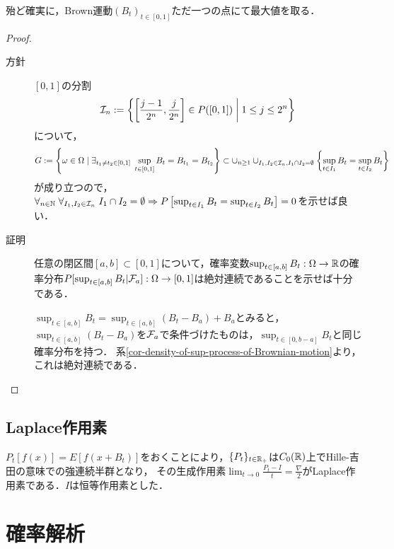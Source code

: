 \documentclass[uplatex,dvipdfmx]{jsreport}
\begin{document}
\begin{lemma}
    殆ど確実に，Brown運動$(B_t)_{t\in[0,1]}$ただ一つの点にて最大値を取る．
\end{lemma}
\begin{proof}\mbox{}
    \begin{description}
        \item[方針] $[0,1]$の分割
        \[\mathcal{I}_n:=\left\{\left[\frac{j-1}{2^n},\frac{j}{2^n}\right]\in P([0,1])\;\middle|\;1\le j\le 2^n\right\}\]
        について，
        \[G:=\left\{\omega\in\Omega\mid\exists_{t_1\ne t_2\in[0,1]}\;\sup_{t\in[0,1]}B_t=B_{t_1}=B_{t_2}\right\}\subset\cup_{n\ge 1}\cup_{I_1,I_2\in\mathcal{I}_n,I_1\cap I_2=\emptyset}\left\{\sup_{t\in I_1}B_t=\sup_{t\in I_2}B_t\right\}\]
        が成り立つので，$\forall_{n\in\mathbb{N}}\;\forall_{I_1,I_2\in\mathcal{I}_n}\;I_1\cap I_2=\emptyset\Rightarrow P\left[\sup_{t\in I_1}B_t=\sup_{t\in I_2}B_t\right]=0$を示せば良い．
        \item[証明] 任意の閉区間$[a,b]\subset[0,1]$について，確率変数$\sup_{t\in[a,b]}B_t:\Omega\to\mathbb{R}$の確率分布$P[\sup_{t\in[a,b]}B_t|\mathcal{F}_a]:\Omega\to[0,1]$は絶対連続であることを示せば十分である．
        
        $\sup_{t\in[a,b]}B_t=\sup_{t\in[a,b]}(B_t-B_a)+B_a$とみると，
        $\sup_{t\in[a,b]}(B_t-B_a)$を$\mathcal{F}_a$で条件づけたものは，$\sup_{t\in[0,b-a]}B_t$と同じ確率分布を持つ．
        系\ref{cor-density-of-sup-process-of-Brownian-motion}より，これは絶対連続である．
    \end{description}
\end{proof}


\section{Laplace作用素}

\begin{tcolorbox}[colframe=ForestGreen, colback=ForestGreen!10!white,breakable,colbacktitle=ForestGreen!40!white,coltitle=black,fonttitle=\bfseries\sffamily,
title=]
    $P_t[f(x)]=E[f(x+B_t)]$をおくことにより，$\{P_t\}_{t\in\mathbb{R}_+}$は$C_0(\mathbb{R})$上でHille-吉田の意味での強連続半群となり，
    その生成作用素$\lim_{t\to0}\frac{P_t-I}{t}=\frac{\nabla}{2}$がLaplace作用素である．$I$は恒等作用素とした．
\end{tcolorbox}



\chapter{確率解析}
\end{document}
